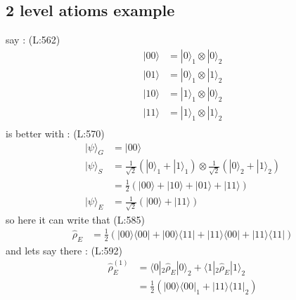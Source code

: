 \subsection{2 level atioms example}
 say : 
(L:562)
\begin{equation}
\begin{split}
|00\rangle &=|0\rangle _{1}\otimes |0\rangle _{2}\\
|01\rangle &=|0\rangle _{1}\otimes |1\rangle _{2}\\
|10\rangle &=|1\rangle _{1}\otimes |0\rangle _{2}\\
|11\rangle &=|1\rangle _{1}\otimes |1\rangle _{2}\\
\end{split}
\end{equation}
 is better with : 
(L:570)
\begin{equation}
\begin{split}
|\psi \rangle _{G }&=|00\rangle \\
|\psi \rangle _{S }&=\frac{1}{\sqrt{2}}(|0\rangle _{1}+|1\rangle _{1})\otimes \frac{1}{\sqrt{2}}(|0\rangle _{2}+|1\rangle _{2})\\
&=\frac{1}{2}(|00\rangle +|10\rangle +|01\rangle +|11\rangle )\\
|\psi \rangle _{E }&=\frac{1}{\sqrt{2}}(|00\rangle +|11\rangle )\end{split}
\end{equation}
 so here it can write that 
(L:585)
\begin{equation}
\begin{split}
\hat{\rho }_{E }&=\frac{1}{2}(|00\rangle \langle 00|+|00\rangle \langle 11|+|11\rangle \langle 00|+|11\rangle \langle 11|)\end{split}
\end{equation}
 and lets say there : 
(L:592)
\begin{equation}
\begin{split}
\hat{\rho }_{E }^{(1)}&=\langle 0|_{2}\hat{\rho }_{E }|0\rangle _{2}+\langle 1|_{2}\hat{\rho }_{E }|1\rangle _{2}\\
&=\frac{1}{2}(|00\rangle \langle 00|_{1}+|11\rangle \langle 11|_{2})\end{split}
\end{equation}
